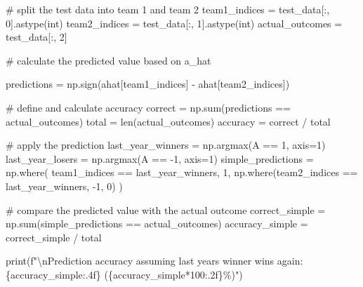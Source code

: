 \documentclass[
  letterpaper,
  DIV=11,
  numbers=noendperiod]{scrartcl}
\newenvironment{Shaded}{\begin{snugshade}}{\end{snugshade}}
\newcommand{\BuiltInTok}[1]{\textcolor[rgb]{0.00,0.23,0.31}{#1}}
\newcommand{\CharTok}[1]{\textcolor[rgb]{0.13,0.47,0.30}{#1}}
\newcommand{\CommentTok}[1]{\textcolor[rgb]{0.37,0.37,0.37}{#1}}
\newcommand{\DecValTok}[1]{\textcolor[rgb]{0.68,0.00,0.00}{#1}}
\newcommand{\NormalTok}[1]{\textcolor[rgb]{0.00,0.23,0.31}{#1}}
\newcommand{\OperatorTok}[1]{\textcolor[rgb]{0.37,0.37,0.37}{#1}}
\newcommand{\SpecialCharTok}[1]{\textcolor[rgb]{0.37,0.37,0.37}{#1}}
\newcommand{\SpecialStringTok}[1]{\textcolor[rgb]{0.13,0.47,0.30}{#1}}
\begin{document}
\begin{Shaded}
\begin{Highlighting}[]
\CommentTok{\# split the test data into team 1 and team 2}
\NormalTok{team1\_indices }\OperatorTok{=}\NormalTok{ test\_data[:, }\DecValTok{0}\NormalTok{].astype(}\BuiltInTok{int}\NormalTok{)  }
\NormalTok{team2\_indices }\OperatorTok{=}\NormalTok{ test\_data[:, }\DecValTok{1}\NormalTok{].astype(}\BuiltInTok{int}\NormalTok{)  }
\NormalTok{actual\_outcomes }\OperatorTok{=}\NormalTok{ test\_data[:, }\DecValTok{2}\NormalTok{]            }

\CommentTok{\# calculate the predicted value based on a\_hat}

\NormalTok{predictions }\OperatorTok{=}\NormalTok{ np.sign(ahat[team1\_indices] }\OperatorTok{{-}}\NormalTok{ ahat[team2\_indices])}

\CommentTok{\# define and calculate accuracy}
\NormalTok{correct }\OperatorTok{=}\NormalTok{ np.}\BuiltInTok{sum}\NormalTok{(predictions }\OperatorTok{==}\NormalTok{ actual\_outcomes)}
\NormalTok{total }\OperatorTok{=} \BuiltInTok{len}\NormalTok{(actual\_outcomes)}
\NormalTok{accuracy }\OperatorTok{=}\NormalTok{ correct }\OperatorTok{/}\NormalTok{ total}

\CommentTok{\# apply the prediction}
\NormalTok{last\_year\_winners }\OperatorTok{=}\NormalTok{ np.argmax(A }\OperatorTok{==} \DecValTok{1}\NormalTok{, axis}\OperatorTok{=}\DecValTok{1}\NormalTok{)}
\NormalTok{last\_year\_losers }\OperatorTok{=}\NormalTok{ np.argmax(A }\OperatorTok{==} \OperatorTok{{-}}\DecValTok{1}\NormalTok{, axis}\OperatorTok{=}\DecValTok{1}\NormalTok{)}
\NormalTok{simple\_predictions }\OperatorTok{=}\NormalTok{ np.where(}
\NormalTok{    team1\_indices }\OperatorTok{==}\NormalTok{ last\_year\_winners, }\DecValTok{1}\NormalTok{,}
\NormalTok{    np.where(team2\_indices }\OperatorTok{==}\NormalTok{ last\_year\_winners, }\OperatorTok{{-}}\DecValTok{1}\NormalTok{, }\DecValTok{0}\NormalTok{)}
\NormalTok{)}

\CommentTok{\# compare the predicted value with the actual outcome}
\NormalTok{correct\_simple }\OperatorTok{=}\NormalTok{ np.}\BuiltInTok{sum}\NormalTok{(simple\_predictions }\OperatorTok{==}\NormalTok{ actual\_outcomes)}
\NormalTok{accuracy\_simple }\OperatorTok{=}\NormalTok{ correct\_simple }\OperatorTok{/}\NormalTok{ total}

\BuiltInTok{print}\NormalTok{(}\SpecialStringTok{f"}\CharTok{\textbackslash{}n}\SpecialStringTok{Prediction accuracy assuming last year\textquotesingle{}s winner wins again: }\SpecialCharTok{\{}\NormalTok{accuracy\_simple}\SpecialCharTok{:.4f\}}\SpecialStringTok{ (}\SpecialCharTok{\{}\NormalTok{accuracy\_simple}\OperatorTok{*}\DecValTok{100}\SpecialCharTok{:.2f\}}\SpecialStringTok{\%)"}\NormalTok{)}
\end{Highlighting}
\end{Shaded}
\end{document}
